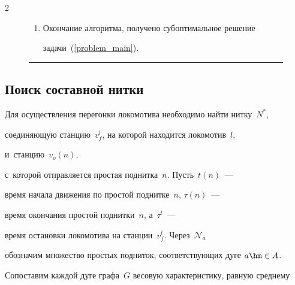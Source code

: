 \begin{multicols}{2}
\begin{figure}
\begin{enumerate}[1.]
        \item


        Окончание алгоритма, получено субоптимальное решение 


        задачи~(\ref{problem_main}).





    \end{enumerate}


    \hrule




\end{figure}













\vspace*{-6pt}





\subsection{Поиск составной нитки} \label{N*}





\vspace*{-2pt}





Для осуществления перегонки локомотива необходимо найти нитку~$N^*$, 


соединяющую станцию~$v^l_f$, на которой находится локомотив~$l$,\linebreak


 и~станцию~$v_o(n)$, 


с~которой отправляется прос\-тая поднитка~$n$. Пусть~$t(n)$~--- 


время начала движения по простой поднитке~$n$, $\tau(n)$~--- 


время окончания прос\-той поднитки~$n$, а~$\tau^l$~--- 


время остановки локомотива на станции~$v^l_f$. Через~$\mathcal N_a$ 


обозначим множество прос\-тых подниток, соответствующих дуге $a\hm\in A$. 


Сопоставим каждой дуге графа~$G$ весовую характеристику, равную среднему 



\end{multicols}
